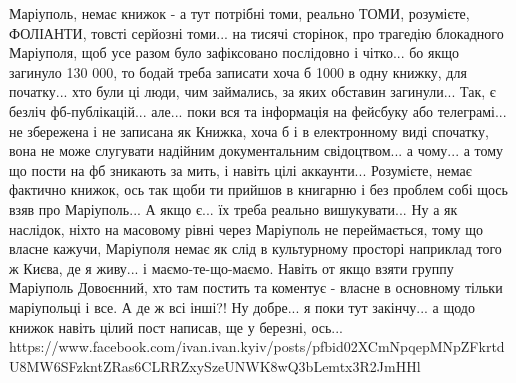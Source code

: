 Маріуполь, немає книжок - а тут потрібні томи, реально ТОМИ, розумієте,
ФОЛІАНТИ, товсті серйозні томи... на тисячі сторінок, про трагедію блокадного
Маріуполя, щоб усе разом було зафіксовано послідовно і чітко... бо якщо
загинуло 130 000, то бодай треба записати хоча б 1000 в одну книжку, для
початку... хто були ці люди, чим займались, за яких обставин загинули... Так, є
безліч фб-публікацій... але... поки вся та інформація на фейсбуку або
телеграмі... не збережена і не записана як Книжка, хоча б і в електронному виді
спочатку, вона не може слугувати надійним документальним свідоцтвом... а
чому... а тому що пости на фб зникають за мить, і навіть цілі аккаунти...
Розумієте, немає фактично книжок, ось так щоби ти прийшов в книгарню і без
проблем собі щось взяв про Маріуполь... А якщо є... їх треба реально
вишукувати... Ну а як наслідок, ніхто на масовому рівні через Маріуполь не
переймається, тому що власне кажучи, Маріуполя немає як слід в культурному
просторі наприклад того ж Києва, де я живу... і маємо-те-що-маємо. Навіть от
якщо взяти группу Маріуполь Довоєнний, хто там постить та коментує - власне в
основному тільки маріупольці і все. А де ж всі інші?! Ну добре... я поки тут
закінчу... а щодо книжок навіть цілий пост написав, ще у березні, ось...
https://www.facebook.com/ivan.ivan.kyiv/posts/pfbid02XCmNpqepMNpZFkrtdU8MW6SFzkntZRas6CLRRZxySzeUNWK8wQ3bLemtx3R2JmHHl

